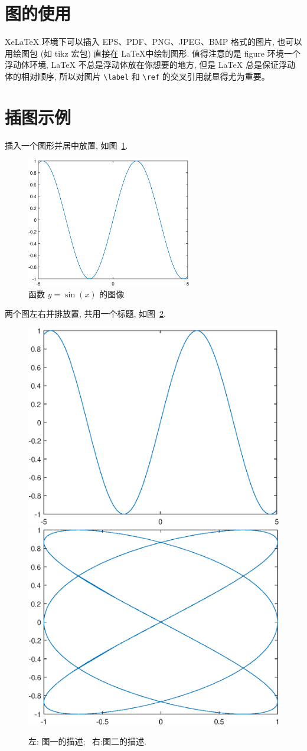 \documentclass[UTF8,openany]{ctexbook}
\numberwithin{equation}{chapter}
\numberwithin{figure}{chapter}
\numberwithin{table}{chapter}
\theoremstyle{mystyle}
\begin{document}
\section{图的使用}

XeLaTeX 环境下可以插入 EPS、PDF、PNG、JPEG、BMP 格式的图片, 也可以用绘图包 (如 tikz 宏包) 直接在 \LaTeX 中绘制图形. 值得注意的是 figure 环境一个浮动体环境, LaTeX 不总是浮动体放在你想要的地方, 但是 LaTeX 总是保证浮动体的相对顺序, 所以对图片 \verb|\label| 和 \verb|\ref| 的交叉引用就显得尤为重要。

\section{插图示例}\label{sec:4-2}

插入一个图形并居中放置, 如图~\ref{fig:sinx}.
\begin{figure}[htp!]
  \centering
  \includegraphics[width=7.2cm]{image1}
  \caption{函数 $y=\sin(x)$ 的图像}\label{fig:sinx}
\end{figure}

\clearpage
两个图左右并排放置, 共用一个标题, 如图~\ref{fig:twofigs}.
\begin{figure}[htp!]
  \centering
  \includegraphics[width=0.45\linewidth]{image1}
  \hfill
  \includegraphics[width=0.45\linewidth]{image2}
  \caption{左: 图一的描述;~ 右:图二的描述.}
  \label{fig:twofigs}
\end{figure}
\end{document}
